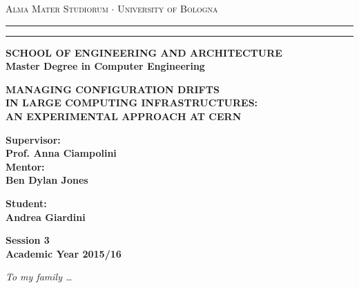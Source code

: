 \documentclass[12pt,a4paper,openright]{report}
\begin{document}
\begin{titlepage}
    \begin{center}
        {{\Large{\textsc{Alma Mater Studiorum $\cdot$ University of
        Bologna}}}} \rule[0.1cm]{15.8cm}{0.1mm}
        \rule[0.5cm]{15.8cm}{0.6mm}
        {\small{\bf SCHOOL OF ENGINEERING AND ARCHITECTURE\\
        Master Degree in Computer Engineering }}
        \end{center}
        \vspace{15mm}
        \begin{center}
        {\LARGE{\bf MANAGING CONFIGURATION DRIFTS}}\\
        \vspace{3mm}
        {\LARGE{\bf IN LARGE COMPUTING INFRASTRUCTURES:}}\\
        \vspace{3mm}
        {\LARGE{\bf AN EXPERIMENTAL APPROACH AT CERN}}\\
        \end{center}
        \vspace{40mm}
        \par
        \noindent
        \begin{minipage}[t]{0.47\textwidth}
        {\large{\bf Supervisor:\\
        Prof. Anna Ciampolini\\
        Mentor:\\
        Ben Dylan Jones}}
        \end{minipage}
        \hfill
        \begin{minipage}[t]{0.47\textwidth}\raggedleft
        {\large{\bf Student:\\
        Andrea Giardini}}
        \end{minipage}
        \vspace{11mm}
        \begin{center}
        {\large{\bf Session 3\\%
        Academic Year 2015/16}}%
    \end{center}
\end{titlepage}

\begin{titlepage}
    \thispagestyle{empty}
    \topmargin=6.5cm
    \raggedleft
    \large
    \em
    To my family \ldots
    \newpage
    \clearpage{\pagestyle{empty}\cleardoublepage}
\end{titlepage}
\end{document}
